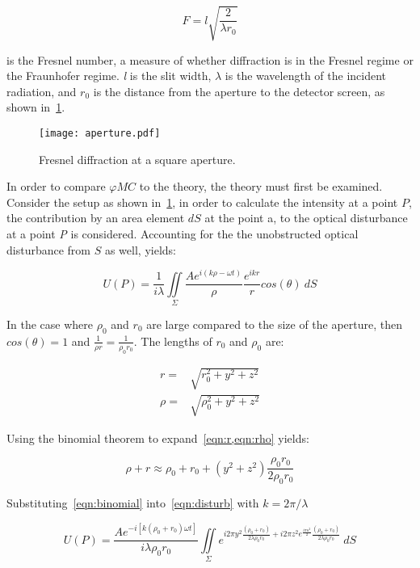 \begin{equation}
F = l\sqrt{\frac{2}{\lambda r_0}}
\label{eqn:fnumber}
\end{equation}

 is the Fresnel number, a measure of whether diffraction is in the Fresnel regime or the Fraunhofer regime.
\textit{l} is the slit width, $\lambda$ is the wavelength of the incident radiation, and $r_0$ is the distance from the aperture to the detector screen, as shown in~\cref{fig:aperture}. 

\medskip
\begin{figure}[!ht]
    \centering
    \texttt{[image: aperture.pdf]}
    \caption{Fresnel diffraction at a square aperture.}
    \label{fig:aperture}
\end{figure}

In order to compare $\varphi MC$ to the theory, the theory must first be examined.
Consider the setup as shown in~\cref{fig:aperture}, in order to calculate the intensity at a point $P$, the contribution by an area element $dS$ at the point a, to the optical disturbance at a point \textit{P} is considered.
Accounting for the the unobstructed optical disturbance from $S$ as well, yields: 


\begin{equation}
U(P)=\frac{1}{i\lambda}\iint\limits_{\Sigma} \frac{Ae^{i(k\rho-\omega t)}}{\rho} \frac{e^{ikr}}{r}cos(\theta)\ dS
\label{eqn:disturb}
\end{equation}


In the case where $\rho_0$ and $r_0$ are large compared to the size of the aperture, then $cos(\theta) = 1$ and $\tfrac{1}{\rho r}=\tfrac{1}{\rho_0 r_0}$.
The lengths of $r_0$ and $\rho_0$ are:

\begin{align}
r=&\sqrt{r_0^2+y^2+z^2}\label{eqn:r} \\
\rho=&\sqrt{\rho_0^2+y^2+z^2}\label{eqn:rho}
\end{align}

Using the binomial theorem to expand~\cref{eqn:r,eqn:rho} yields:

\begin{equation}
\rho + r \approx \rho_0 + r_0 + (y^2+z^2)\frac{\rho_0r_0}{2\rho_0r_0}
\label{eqn:binomial}
\end{equation}

Substituting~\cref{eqn:binomial} into~\cref{eqn:disturb} with $k=2\pi/\lambda$

\begin{equation}
U(P)=\frac{Ae^{-i[k(\rho_0+r_0)\omega t]}}{i\lambda\rho_0r_0}\iint\limits_{\Sigma} e^{i2\pi y^2\tfrac{(\rho_0+r_0)}{2\lambda\rho_0r_0}+i2\pi z^2e^{\frac{i\pi u^2}{2}}\tfrac{(\rho_0+r_0)}{2\lambda\rho_0r_0}} \ dS
\label{eqn:midway}
\end{equation}


